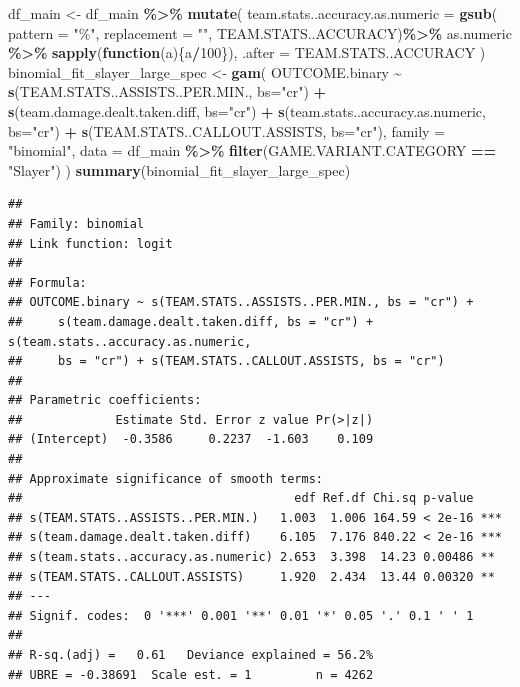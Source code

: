 \documentclass[
]{article}
\newenvironment{Shaded}{\begin{snugshade}}{\end{snugshade}}
\newcommand{\AttributeTok}[1]{\textcolor[rgb]{0.13,0.29,0.53}{#1}}
\newcommand{\ControlFlowTok}[1]{\textcolor[rgb]{0.13,0.29,0.53}{\textbf{#1}}}
\newcommand{\DecValTok}[1]{\textcolor[rgb]{0.00,0.00,0.81}{#1}}
\newcommand{\FunctionTok}[1]{\textcolor[rgb]{0.13,0.29,0.53}{\textbf{#1}}}
\newcommand{\NormalTok}[1]{#1}
\newcommand{\OtherTok}[1]{\textcolor[rgb]{0.56,0.35,0.01}{#1}}
\newcommand{\SpecialCharTok}[1]{\textcolor[rgb]{0.81,0.36,0.00}{\textbf{#1}}}
\newcommand{\StringTok}[1]{\textcolor[rgb]{0.31,0.60,0.02}{#1}}
\begin{document}
\begin{Shaded}
\begin{Highlighting}[]
\NormalTok{df\_main }\OtherTok{\textless{}{-}}\NormalTok{ df\_main }\SpecialCharTok{\%\textgreater{}\%} 
  \FunctionTok{mutate}\NormalTok{(}
    \AttributeTok{team.stats..accuracy.as.numeric =} \FunctionTok{gsub}\NormalTok{(}
      \AttributeTok{pattern =} \StringTok{"\%"}\NormalTok{,}
      \AttributeTok{replacement =} \StringTok{""}\NormalTok{,}
\NormalTok{      TEAM.STATS..ACCURACY)}\SpecialCharTok{\%\textgreater{}\%}\NormalTok{ as.numeric }\SpecialCharTok{\%\textgreater{}\%} \FunctionTok{sapply}\NormalTok{(}\ControlFlowTok{function}\NormalTok{(a)\{a}\SpecialCharTok{/}\DecValTok{100}\NormalTok{\}),}
    \AttributeTok{.after =}\NormalTok{ TEAM.STATS..ACCURACY}
\NormalTok{    )}
\NormalTok{binomial\_fit\_slayer\_large\_spec }\OtherTok{\textless{}{-}} \FunctionTok{gam}\NormalTok{(}
\NormalTok{  OUTCOME.binary }\SpecialCharTok{\textasciitilde{}} \FunctionTok{s}\NormalTok{(TEAM.STATS..ASSISTS..PER.MIN., }\AttributeTok{bs=}\StringTok{"cr"}\NormalTok{) }\SpecialCharTok{+} \FunctionTok{s}\NormalTok{(team.damage.dealt.taken.diff, }\AttributeTok{bs=}\StringTok{"cr"}\NormalTok{) }\SpecialCharTok{+} \FunctionTok{s}\NormalTok{(team.stats..accuracy.as.numeric, }\AttributeTok{bs=}\StringTok{"cr"}\NormalTok{) }\SpecialCharTok{+} \FunctionTok{s}\NormalTok{(TEAM.STATS..CALLOUT.ASSISTS, }\AttributeTok{bs=}\StringTok{"cr"}\NormalTok{),}
  \AttributeTok{family =} \StringTok{"binomial"}\NormalTok{,}
  \AttributeTok{data =}\NormalTok{ df\_main }\SpecialCharTok{\%\textgreater{}\%} 
    \FunctionTok{filter}\NormalTok{(GAME.VARIANT.CATEGORY }\SpecialCharTok{==} \StringTok{"Slayer"}\NormalTok{)}
\NormalTok{)}
\FunctionTok{summary}\NormalTok{(binomial\_fit\_slayer\_large\_spec)}
\end{Highlighting}
\end{Shaded}

\begin{verbatim}
## 
## Family: binomial 
## Link function: logit 
## 
## Formula:
## OUTCOME.binary ~ s(TEAM.STATS..ASSISTS..PER.MIN., bs = "cr") + 
##     s(team.damage.dealt.taken.diff, bs = "cr") + s(team.stats..accuracy.as.numeric, 
##     bs = "cr") + s(TEAM.STATS..CALLOUT.ASSISTS, bs = "cr")
## 
## Parametric coefficients:
##             Estimate Std. Error z value Pr(>|z|)
## (Intercept)  -0.3586     0.2237  -1.603    0.109
## 
## Approximate significance of smooth terms:
##                                      edf Ref.df Chi.sq p-value    
## s(TEAM.STATS..ASSISTS..PER.MIN.)   1.003  1.006 164.59 < 2e-16 ***
## s(team.damage.dealt.taken.diff)    6.105  7.176 840.22 < 2e-16 ***
## s(team.stats..accuracy.as.numeric) 2.653  3.398  14.23 0.00486 ** 
## s(TEAM.STATS..CALLOUT.ASSISTS)     1.920  2.434  13.44 0.00320 ** 
## ---
## Signif. codes:  0 '***' 0.001 '**' 0.01 '*' 0.05 '.' 0.1 ' ' 1
## 
## R-sq.(adj) =   0.61   Deviance explained = 56.2%
## UBRE = -0.38691  Scale est. = 1         n = 4262
\end{verbatim}
\end{document}
